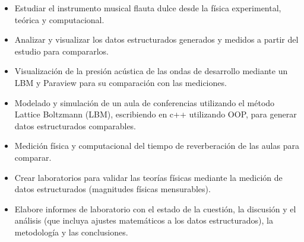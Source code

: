 \documentclass[10pt,letter,ragged2e,withhyper]{altacv}
\begin{document}
\begin{paracol}{2}
\divider

\begin{itemize}
\item Estudiar el instrumento musical flauta dulce desde la física experimental, teórica y computacional.
\item Analizar y visualizar los datos estructurados generados y medidos a partir del estudio para compararlos.
\item Visualización de la presión acústica de las ondas de desarrollo mediante un LBM y Paraview para su comparación con las mediciones.

\end{itemize}

\divider

\begin{itemize}
\item Modelado y simulación de un aula de conferencias utilizando el método Lattice Boltzmann (LBM), escribiendo en c++ utilizando OOP, para generar datos estructurados comparables.
\item Medición física y computacional del tiempo de reverberación de las aulas para comparar.
\end{itemize}

\divider

\begin{itemize}
\item Crear laboratorios para validar las teorías físicas mediante la medición de datos estructurados (magnitudes físicas mensurables).
\item Elabore informes de laboratorio con el estado de la cuestión, la discusión y el análisis (que incluya ajustes matemáticos a los datos estructurados), la metodología y las conclusiones.
\end{itemize}






\end{paracol}
\end{document}
